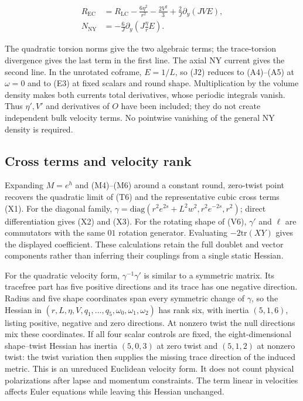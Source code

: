 \begin{equation}\tag{J2}\label{eq:J2}
\begin{aligned}
R_{\mathrm{EC}}&=R_{\mathrm{LC}}-\frac{6\eta^2}{r^2}
-\frac{2V^2}{3}+\frac2J\partial_y(JVE),\\
N_{\mathrm{NY}}&=-\frac6J\partial_y\left(J\frac{\eta}{r}E\right).
\end{aligned}
\end{equation}

The quadratic torsion norms give the two algebraic terms; the trace-torsion divergence gives the last term in the first line. The axial NY current gives the second line. In the unrotated coframe, $E=1/L$, so (J2) reduces to (A4)--(A5) at $\omega=0$ and to (E3) at fixed scalars and round shape. Multiplication by the volume density makes both currents total derivatives, whose periodic integrals vanish. Thus $\eta',V'$ and derivatives of $O$ have been included; they do not create independent bulk velocity terms. No pointwise vanishing of the general NY density is required.

\subsection{Cross terms and velocity rank}

Expanding $M=e^h$ and (M4)--(M6) around a constant round, zero-twist point recovers the quadratic limit of (T6) and the representative cubic cross terms (X1). For the diagonal family, $\gamma=\mathrm{diag}(r^2e^{2s}+L^2w^2,r^2e^{-2s},r^2)$; direct differentiation gives (X2) and (X3). For the rotating shape of (V6), $\gamma'$ and $\ell$ are commutators with the same $01$ rotation generator. Evaluating $-2\mathrm{tr}(XY)$ gives the displayed coefficient. These calculations retain the full doublet and vector components rather than inferring their couplings from a single static Hessian.

For the quadratic velocity form, $\gamma^{-1}\gamma'$ is similar to a symmetric matrix. Its tracefree part has five positive directions and its trace has one negative direction. Radius and five shape coordinates span every symmetric change of $\gamma$, so the Hessian in $(r,L,\eta,V,q_1,\ldots,q_5,\omega_0,\omega_1,\omega_2)$ has rank six, with inertia $(5,1,6)$, listing positive, negative and zero directions. At nonzero twist the null directions mix these coordinates. If all four scalar controls are fixed, the eight-dimensional shape--twist Hessian has inertia $(5,0,3)$ at zero twist and $(5,1,2)$ at nonzero twist: the twist variation then supplies the missing trace direction of the induced metric. This is an unreduced Euclidean velocity form. It does not count physical polarizations after lapse and momentum constraints. The term linear in velocities affects Euler equations while leaving this Hessian unchanged.
